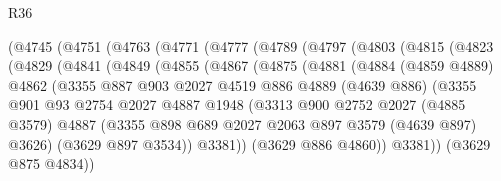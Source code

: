 \begin{lexlean}{R36}
\begin{coremodule}
        (@4745
          (@4751
            (@4763
              (@4771
                (@4777
                  (@4789
                    (@4797
                      (@4803
                        (@4815
                          (@4823
                            (@4829
                              (@4841
                                (@4849
                                  (@4855
                                    (@4867
                                      (@4875
                                        (@4881
                                          (@4884
                                            (@4859 @4889)
                                            @4862
                                            (@3355
                                              @887
                                              @903
                                              @2027
                                              @4519
                                              @886
                                              @4889
                                              (@4639 @886)
                                              (@3355
                                                @901
                                                @93
                                                @2754
                                                @2027
                                                @4887
                                                @1948
                                                (@3313
                                                  @900
                                                  @2752
                                                  @2027
                                                  (@4885 @3579)
                                                  @4887
                                                  (@3355
                                                    @898
                                                    @689
                                                    @2027
                                                    @2063
                                                    @897
                                                    @3579
                                                    (@4639 @897)
                                                    @3626)
                                                  (@3629 @897 @3534))
                                                @3381))
                                            (@3629 @886 @4860))
                                          @3381))
                                      (@3629 @875 @4834))

\end{coremodule}
\end{lexlean}
